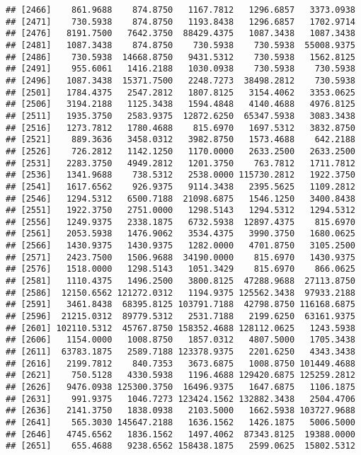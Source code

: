 \documentclass[]{article}
\begin{document}
\begin{verbatim}
## [2466]    861.9688    874.8750   1167.7812   1296.6857   3373.0938
## [2471]    730.5938    874.8750   1193.8438   1296.6857   1702.9714
## [2476]   8191.7500   7642.3750  88429.4375   1087.3438   1087.3438
## [2481]   1087.3438    874.8750    730.5938    730.5938  55008.9375
## [2486]    730.5938  14668.8750   9431.5312    730.5938   1562.8125
## [2491]    955.6061   1416.2188   1030.0938    730.5938    730.5938
## [2496]   1087.3438  15371.7500   2248.7273  38498.2812    730.5938
## [2501]   1784.4375   2547.2812   1807.8125   3154.4062   3353.0625
## [2506]   3194.2188   1125.3438   1594.4848   4140.4688   4976.8125
## [2511]   1935.3750   2583.9375  12872.6250  65347.5938   3083.3438
## [2516]   1273.7812   1780.4688    815.6970   1697.5312   3832.8750
## [2521]    889.3636   3458.0312   3982.8750   1573.4688    642.2188
## [2526]    726.2812   1142.1250   1170.0000   2633.2500   2633.2500
## [2531]   2283.3750   4949.2812   1201.3750    763.7812   1711.7812
## [2536]   1341.9688    738.5312   2538.0000 115730.2812   1922.3750
## [2541]   1617.6562    926.9375   9114.3438   2395.5625   1109.2812
## [2546]   1294.5312   6500.7188  21098.6875   1546.1250   3400.8438
## [2551]   1922.3750   2751.0000   1298.5143   1294.5312   1294.5312
## [2556]   1249.9375   2338.1875   6732.5938  12897.4375    815.6970
## [2561]   2053.5938   1476.9062   3534.4375   3990.3750   1680.0625
## [2566]   1430.9375   1430.9375   1282.0000   4701.8750   3105.2500
## [2571]   2423.7500   1506.9688  34190.0000    815.6970   1430.9375
## [2576]   1518.0000   1298.5143   1051.3429    815.6970    866.0625
## [2581]   1110.4375   1496.2500   3800.8125  47288.9688  27113.8750
## [2586]  12150.6562 121272.0312   1194.9375 125562.3438  97933.2188
## [2591]   3461.8438  68395.8125 103791.7188  42798.8750 116168.6875
## [2596]  21215.0312  89779.5312   2531.7188   2199.6250  63161.9375
## [2601] 102110.5312  45767.8750 158352.4688 128112.0625   1243.5938
## [2606]   1154.0000   1008.8750   1857.0312   4807.5000   1705.3438
## [2611]  63783.1875   2589.7188 123378.9375   2201.6250   4343.3438
## [2616]   2199.7812    840.7353   3673.6875   1008.8750 101449.4688
## [2621]    750.5128   4330.5938   1196.4688 129420.6875 125259.2812
## [2626]   9476.0938 125300.3750  16496.9375   1647.6875   1106.1875
## [2631]    991.9375   1046.7273 123424.1562 132882.3438   2504.4706
## [2636]   2141.3750   1838.0938   2103.5000   1662.5938 103727.9688
## [2641]    565.3030 145647.2188   1636.1562   1426.1875   5006.5000
## [2646]   4745.6562   1836.1562   1497.4062  87343.8125  19388.0000
## [2651]    655.4688   9238.6562 158438.1875   2599.0625  15802.5312

\end{verbatim}
\end{document}
